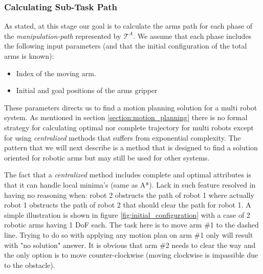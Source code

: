 \subsubsection*{Calculating Sub-Task Path}
As stated, at this stage our goal is to calculate the arms path for each phase of the \textit{manipulation-path} represented by $\mathcal{T}^A$. We assume that each phase includes the following input parameters (and that the initial configuration of the total arms is known):

\begin{itemize}
	\item Index of the moving arm.
	\item Initial and goal positions of the arms gripper
\end{itemize}

These parameters directs us to find a motion planning solution for a multi robot system. As mentioned in section \ref{section:motion_planning} there is no formal strategy for calculating optimal nor complete trajectory for multi robots except for using \textit{centralized} methods that suffers from exponential complexity. The pattern that we will next describe is a method that is designed to find a solution oriented for robotic arms but may still be used for other systems. 

The fact that a \textit{centralized} method includes complete and optimal attributes is that it can handle local minima's (same as A*). Lack in such feature resolved in having no reasoning when: robot 2 obstructs the path of robot 1 where actually robot 1 obstructs the path of robot 2 that should clear the path for robot 1. A simple illustration is shown in figure \ref{fig:initial_configuration} with a case of 2 robotic arms having 1 DoF each. The task here is to move arm \#1 to the dashed line. Trying to do so with applying any motion plan on arm \#1 only will result with "no solution" answer. It is obvious that arm \#2 needs to clear the way and the only option is to move counter-clockwise (moving clockwise is impassible due to the obstacle). 



